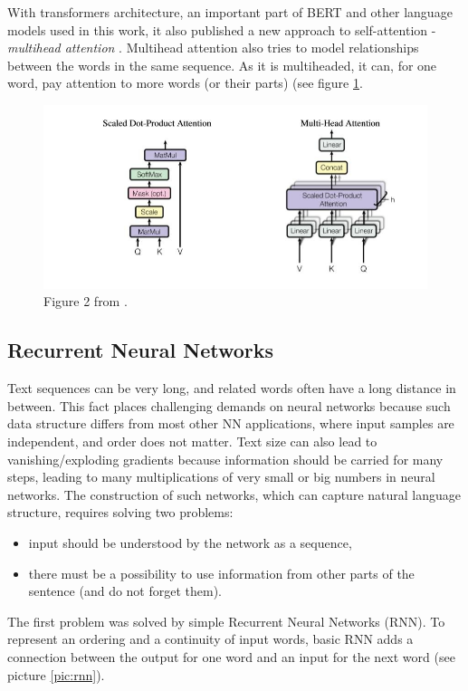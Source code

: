 With transformers architecture, an important part of BERT and other language models used in this work, it also published a new approach to self-attention - \textit{multihead attention} \citep{Vaswani2017}. Multihead attention also tries to model relationships between the words in the same sequence. As it is multiheaded, it can, for one word, pay attention to more words (or their parts) (see figure \ref{pic:att_multi}.
\begin{figure}[h]
\centering
\includegraphics[width=1\columnwidth]{../img/attention_multi}
\caption{Figure 2 from \citep{Vaswani2017}. %
}
\label{pic:att_multi}
\end{figure}
\subsection{Recurrent Neural Networks}
\label{sub:RNN}
Text sequences can be very long, and related words often have a long distance in between. This fact places challenging demands on neural networks because such data structure differs from most other NN applications, where input samples are independent, and order does not matter. Text size can also lead to vanishing/exploding gradients because information should be carried for many steps, leading to many multiplications of very small or big numbers in neural networks. The construction of such networks, which can capture natural language structure, requires solving two problems:
\begin{itemize}
\item input should be understood by the network as a sequence,
\item there must be a possibility to use information from other parts of the sentence (and do not forget them).
\end{itemize}
The first problem was solved by simple Recurrent Neural Networks (RNN). To represent an ordering and a continuity of input words, basic RNN adds a connection between the output for one word and an input for the next word (see picture \ref{pic:rnn}). 
 
